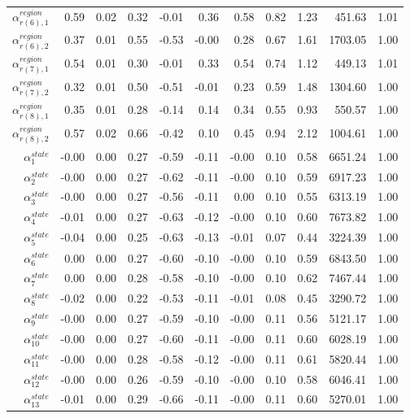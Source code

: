 \documentclass[12pt,english,a4paper]{article}
\begin{document}
\begin{table}[ht]
\begin{tabular}{rrrrrrrrrrr}
  $\alpha_{r(6),1}^{region}$ & 0.59 & 0.02 & 0.32 & -0.01 & 0.36 & 0.58 & 0.82 & 1.23 & 451.63 & 1.01 \\ 
  $\alpha_{r(6),2}^{region}$ & 0.37 & 0.01 & 0.55 & -0.53 & -0.00 & 0.28 & 0.67 & 1.61 & 1703.05 & 1.00 \\ 
  $\alpha_{r(7),1}^{region}$ & 0.54 & 0.01 & 0.30 & -0.01 & 0.33 & 0.54 & 0.74 & 1.12 & 449.13 & 1.01 \\ 
  $\alpha_{r(7),2}^{region}$ & 0.32 & 0.01 & 0.50 & -0.51 & -0.01 & 0.23 & 0.59 & 1.48 & 1304.60 & 1.00 \\ 
  $\alpha_{r(8),1}^{region}$ & 0.35 & 0.01 & 0.28 & -0.14 & 0.14 & 0.34 & 0.55 & 0.93 & 550.57 & 1.00 \\ 
  $\alpha_{r(8),2}^{region}$ & 0.57 & 0.02 & 0.66 & -0.42 & 0.10 & 0.45 & 0.94 & 2.12 & 1004.61 & 1.00 \\ 
  $\alpha_1^{state}$ & -0.00 & 0.00 & 0.27 & -0.59 & -0.11 & -0.00 & 0.10 & 0.58 & 6651.24 & 1.00 \\ 
  $\alpha_2^{state}$ & -0.00 & 0.00 & 0.27 & -0.62 & -0.11 & -0.00 & 0.10 & 0.59 & 6917.23 & 1.00 \\ 
  $\alpha_3^{state}$ & -0.00 & 0.00 & 0.27 & -0.56 & -0.11 & 0.00 & 0.10 & 0.55 & 6313.19 & 1.00 \\ 
  $\alpha_4^{state}$ & -0.01 & 0.00 & 0.27 & -0.63 & -0.12 & -0.00 & 0.10 & 0.60 & 7673.82 & 1.00 \\ 
  $\alpha_5^{state}$ & -0.04 & 0.00 & 0.25 & -0.63 & -0.13 & -0.01 & 0.07 & 0.44 & 3224.39 & 1.00 \\ 
  $\alpha_6^{state}$ & 0.00 & 0.00 & 0.27 & -0.60 & -0.10 & -0.00 & 0.10 & 0.59 & 6843.50 & 1.00 \\ 
  $\alpha_7^{state}$ & 0.00 & 0.00 & 0.28 & -0.58 & -0.10 & -0.00 & 0.10 & 0.62 & 7467.44 & 1.00 \\ 
  $\alpha_8^{state}$ & -0.02 & 0.00 & 0.22 & -0.53 & -0.11 & -0.01 & 0.08 & 0.45 & 3290.72 & 1.00 \\ 
  $\alpha_9^{state}$ & -0.00 & 0.00 & 0.27 & -0.59 & -0.10 & -0.00 & 0.11 & 0.56 & 5121.17 & 1.00 \\ 
  $\alpha_{10}^{state}$ & -0.00 & 0.00 & 0.27 & -0.60 & -0.11 & -0.00 & 0.11 & 0.60 & 6028.19 & 1.00 \\ 
  $\alpha_{11}^{state}$ & -0.00 & 0.00 & 0.28 & -0.58 & -0.12 & -0.00 & 0.11 & 0.61 & 5820.44 & 1.00 \\ 
  $\alpha_{12}^{state}$ & -0.00 & 0.00 & 0.26 & -0.59 & -0.10 & -0.00 & 0.10 & 0.58 & 6046.41 & 1.00 \\ 
  $\alpha_{13}^{state}$ & -0.01 & 0.00 & 0.29 & -0.66 & -0.11 & -0.00 & 0.11 & 0.60 & 5270.01 & 1.00 \\ 

\end{tabular}
\end{table}
\end{document}
